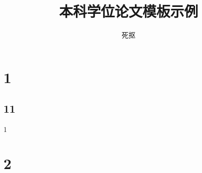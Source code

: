 \documentclass{jxustgt}
\title{本科学位论文模板示例}
\author{死抠}
\begin{document}
	\maketitle
	\tableofcontents\newpage
	\section{1}
	\subsection{11}
	1
	\section{2}
\end{document}
